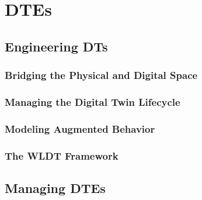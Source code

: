 \documentclass[12pt,a4paper,openright,twoside]{book}
\begin{document}
\part{\aclp{DTE}}

\chapter{Engineering \aclp{DT}}
\label{chap:engineering-digital-twins}

\section{Bridging the Physical and Digital Space}

\section{Managing the Digital Twin Lifecycle}

\section{Modeling Augmented Behavior}

\section{The \acl{WLDT} Framework}

\chapter{Managing \aclp{DTE}}
\label{chap:dtc}
\end{document}
